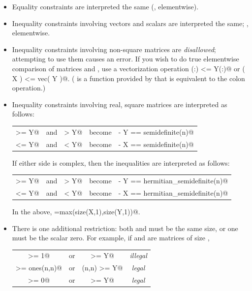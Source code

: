 \documentclass[12pt]{article}
\begin{document}
\begin{itemize}
\item Equality constraints are interpreted the same (\ie, elementwise).
\item Inequality constraints involving vectors and scalars are interpreted
      the same; \ie, elementwise.
\item Inequality constraints involving non-square matrices are \emph{disallowed};
      attempting to use them causes an error. If you wish to do true elementwise
      comparison of matrices \verb@X@ and \verb@Y@, use a vectorization
      operation \verb@X(:) <= Y(:)@ or \verb@vec( X ) <= vec( Y )@. (\verb@vec@
      is a function provided by \cvx that is equivalent to the colon operation.)
\item Inequality constraints involving real, square matrices are interpreted as follows:
	\begin{center}
	\begin{tabular}{ccccc}
	\verb@X >= Y@ & and & \verb@X > Y@ & become & \verb@X - Y == semidefinite(n)@ \\
	\verb@X <= Y@ & and & \verb@X < Y@  & become & \verb@Y - X == semidefinite(n)@
	\end{tabular}
	\end{center}
      If either side is complex, then the inequalities are
      interpreted as follows:
	\begin{center}
	\begin{tabular}{ccccc}
	\verb@X >= Y@ & and & \verb@X > Y@ & become & \verb@X - Y == hermitian_semidefinite(n)@ \\
	\verb@X <= Y@ & and & \verb@X < Y@  & become & \verb@Y - X == hermitian_semidefinite(n)@
	\end{tabular}
	\end{center}
      In the above, \verb@n=max(size(X,1),size(Y,1))@.
\item There is one additional restriction: both
      \verb@X@ and \verb@Y@ must be the same size, or one must
      be the scalar zero. For example, if \verb@X@ and \verb@Y@ are
      matrices of size \verb@n@,
      \begin{center}
      \begin{tabular}{cccc}
      	\verb@X >= 1@ & or & \verb@1 >= Y@ & \emph{illegal} \\
      	\verb@X >= ones(n,n)@ & or & \verb@ones(n,n) >= Y@ & \emph{legal} \\
      	\verb@X >= 0@ & or & \verb@0 >= Y@ & \emph{legal} \\

\end{tabular}
\end{center}
\end{itemize}
\end{document}
